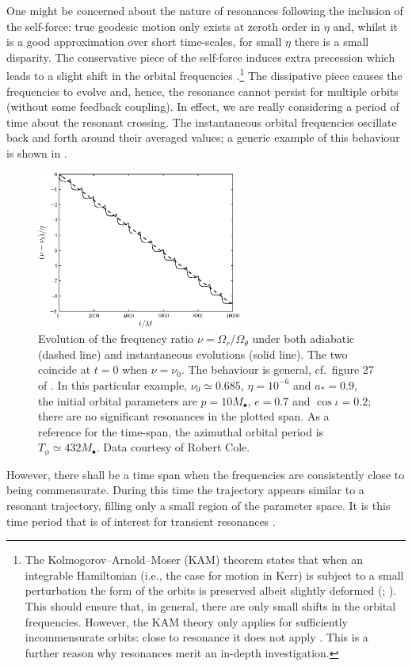 One might be concerned about the nature of resonances following the inclusion of the self-force: true geodesic motion only exists at zeroth order in $\eta$ and, whilst it is a good approximation over short time-scales, for small $\eta$ there is a small disparity. The conservative piece of the self-force induces extra precession which leads to a slight shift in the orbital frequencies \citep{Warburton2012}.\footnote{The Kolmogorov--Arnold--Moser (KAM) theorem states that when an integrable Hamiltonian (i.e., the case for motion in Kerr) is subject to a small perturbation the form of the orbits is preserved albeit slightly deformed (\citealt{Arnold1963}; \citealt[chapter II, section 3.3 d]{Moser1973}). This should ensure that, in general, there are only small shifts in the orbital frequencies. However, the KAM theory only applies for sufficiently incommensurate orbits: close to resonance it does not apply \citep[chapter V, section 1 c]{Moser1973}. This is a further reason why resonances merit an in-depth investigation.} The dissipative piece causes the frequencies to evolve and, hence, the resonance cannot persist for multiple orbits (without some feedback coupling). In effect, we are really considering a period of time about the resonant crossing. The instantaneous orbital frequencies oscillate back and forth around their averaged values; a generic example of this behaviour is shown in .
\begin{figure}%
\centering
\vspace{0.25\baselineskip}
\includegraphics[width=0.6\textwidth]{./images/Fig_ad_vs_inst_wibble}
\caption{Evolution of the frequency ratio $\nu = \Omega_r/\Omega_\theta$ under both adiabatic (dashed line) and instantaneous evolutions (solid line). The two coincide at $t = 0$ when $\nu = \nu_0$. The behaviour is general, cf.\ figure 27 of \citet{Arnold1988}. In this particular example, $\nu_0 \simeq 0.685$, $\eta = 10^{-6}$ and $a_\ast = 0.9$, the initial orbital parameters are $p = 10 M_\bullet$, $e = 0.7$ and $\cos \iota = 0.2$; there are no significant resonances in the plotted span. As a reference for the time-span, the azimuthal orbital period is $T_\phi \simeq 432 M_\bullet$. Data courtesy of Robert Cole.}\label{fig:wibbles}
\end{figure}
However, there shall be a time span when the frequencies are consistently close to being commensurate. During this time the trajectory appears similar to a resonant trajectory, filling only a small region of the parameter space. It is this time period that is of interest for transient resonances \citep{Bosley1992}.

